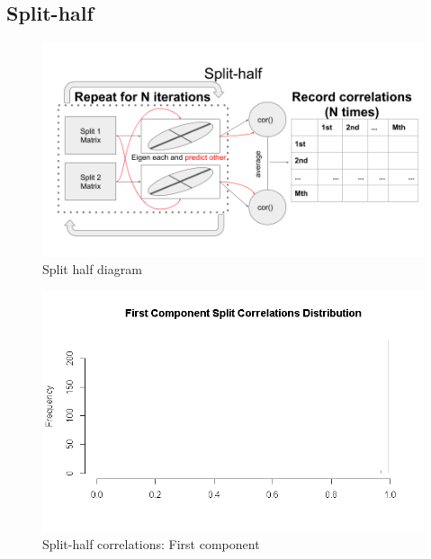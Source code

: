 \documentclass[
  ignorenonframetext,
]{beamer}
\begin{document}
\hypertarget{split-half}{%
\subsection{Split-half}\label{split-half}}

\begin{frame}

\begin{figure}
\centering
\includegraphics{../Images/split_half_diagram.png}
\caption{Split half diagram}
\end{figure}

\end{frame}

\begin{frame}

\begin{figure}
\centering
\includegraphics{../Images/split1.png}
\caption{Split-half correlations: First component}
\end{figure}

\end{frame}
\end{document}
